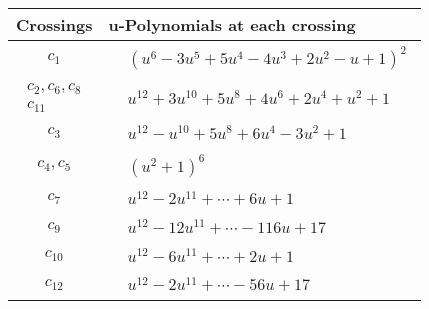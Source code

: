 \documentclass[1p]{elsarticle_modified}
\theoremstyle{definition}
\begin{document}
\begin{tabular}{m{50pt}|m{274pt}}
Crossings & \hspace{64pt}u-Polynomials at each crossing \\
\hline $$\begin{aligned}c_{1}\end{aligned}$$&$\begin{aligned}
&(u^6-3 u^5+5 u^4-4 u^3+2 u^2- u+1)^2
\end{aligned}$\\
\hline $$\begin{aligned}c_{2},c_{6},c_{8}\\c_{11}\end{aligned}$$&$\begin{aligned}
&u^{12}+3 u^{10}+5 u^8+4 u^6+2 u^4+u^2+1
\end{aligned}$\\
\hline $$\begin{aligned}c_{3}\end{aligned}$$&$\begin{aligned}
&u^{12}- u^{10}+5 u^8+6 u^4-3 u^2+1
\end{aligned}$\\
\hline $$\begin{aligned}c_{4},c_{5}\end{aligned}$$&$\begin{aligned}
&(u^2+1)^6
\end{aligned}$\\
\hline $$\begin{aligned}c_{7}\end{aligned}$$&$\begin{aligned}
&u^{12}-2 u^{11}+\cdots+6 u+1
\end{aligned}$\\
\hline $$\begin{aligned}c_{9}\end{aligned}$$&$\begin{aligned}
&u^{12}-12 u^{11}+\cdots-116 u+17
\end{aligned}$\\
\hline $$\begin{aligned}c_{10}\end{aligned}$$&$\begin{aligned}
&u^{12}-6 u^{11}+\cdots+2 u+1
\end{aligned}$\\
\hline $$\begin{aligned}c_{12}\end{aligned}$$&$\begin{aligned}
&u^{12}-2 u^{11}+\cdots-56 u+17
\end{aligned}$\\
\hline
\end{tabular}\\~\\
\end{document}
